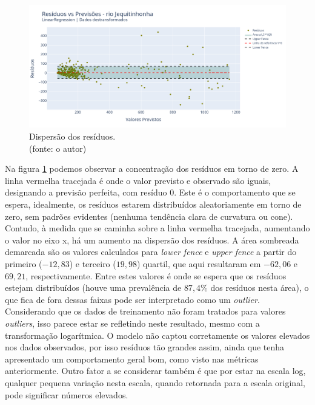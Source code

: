 \begin{figure}[!h]
	\centering
	\includegraphics[scale=0.33]{Figuras/jequiti/wfv/LR/LR_WFV_LOG_RESID_x_PREV.png}
	\caption{Dispersão dos resíduos.\\(fonte: o autor)}
	\label{fig:jequiti_LR_WFV_LOG_RESID_x_PREV}
\end{figure}

Na figura \ref{fig:jequiti_LR_WFV_LOG_RESID_x_PREV} podemos observar a concentração dos resíduos em torno de zero. A linha vermelha tracejada é onde o valor previsto e observado são iguais, designando a previsão perfeita, com resíduo $0$. Este é o comportamento que se espera, idealmente, os resíduos estarem distribuídos aleatoriamente em torno de zero, sem padrões evidentes (nenhuma tendência clara de curvatura ou cone). Contudo, à medida que se caminha sobre a linha vermelha tracejada, aumentando o valor no eixo x, há um aumento na dispersão dos resíduos. A área sombreada demarcada são os valores calculados para \textit{lower fence} e \textit{upper fence} a partir do primeiro ($-12,83$) e terceiro ($19,98$) quartil, que aqui resultaram em $-62,06$ e $69,21$, respectivamente. Entre estes valores é onde se espera que os resíduos estejam distribuídos (houve uma prevalência de $87,4\%$ dos resíduos nesta área), o que fica de fora dessas faixas pode ser interpretado como um \textit{outlier}. Considerando que os dados de treinamento não foram tratados para valores \textit{outliers}, isso parece estar se refletindo neste resultado, mesmo com a transformação logarítmica. O modelo não captou corretamente os valores elevados nos dados observados, por isso resíduos tão grandes assim, ainda que tenha apresentado um comportamento geral bom, como visto nas métricas anteriormente. Outro fator a se considerar também é que por estar na escala log, qualquer pequena variação nesta escala, quando retornada para a escala original, pode significar números elevados.

